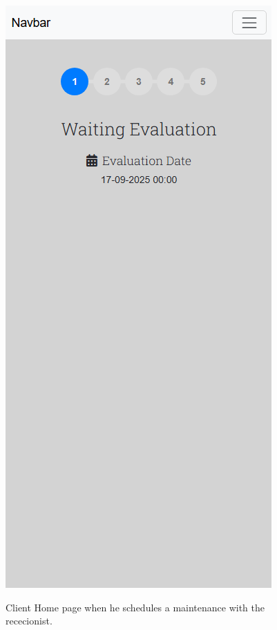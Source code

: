 \begin{figure}[htbp]
  \caption{Client Home page when he schedules a maintenance with the rececionist.}
  \centering
  \includegraphics[width=\textwidth]{figs/Implementation/client/MaintenanceState1}
  \label{fig:MaintenanceState1}
\end{figure}




